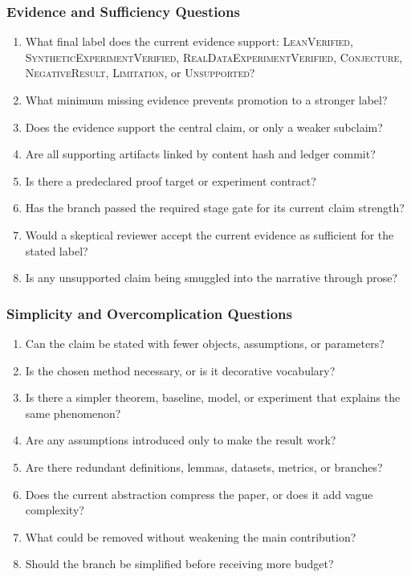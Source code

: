 \documentclass[11pt]{article}
\begin{document}
\subsubsection*{Evidence and Sufficiency Questions}
\begin{enumerate}[leftmargin=*]
    \item What final label does the current evidence support: \textsc{LeanVerified}, \textsc{SyntheticExperimentVerified}, \textsc{RealDataExperimentVerified}, \textsc{Conjecture}, \textsc{NegativeResult}, \textsc{Limitation}, or \textsc{Unsupported}?
    \item What minimum missing evidence prevents promotion to a stronger label?
    \item Does the evidence support the central claim, or only a weaker subclaim?
    \item Are all supporting artifacts linked by content hash and ledger commit?
    \item Is there a predeclared proof target or experiment contract?
    \item Has the branch passed the required stage gate for its current claim strength?
    \item Would a skeptical reviewer accept the current evidence as sufficient for the stated label?
    \item Is any unsupported claim being smuggled into the narrative through prose?
\end{enumerate}

\subsubsection*{Simplicity and Overcomplication Questions}
\begin{enumerate}[leftmargin=*]
    \item Can the claim be stated with fewer objects, assumptions, or parameters?
    \item Is the chosen method necessary, or is it decorative vocabulary?
    \item Is there a simpler theorem, baseline, model, or experiment that explains the same phenomenon?
    \item Are any assumptions introduced only to make the result work?
    \item Are there redundant definitions, lemmas, datasets, metrics, or branches?
    \item Does the current abstraction compress the paper, or does it add vague complexity?
    \item What could be removed without weakening the main contribution?
    \item Should the branch be simplified before receiving more budget?
\end{enumerate}
\end{document}
